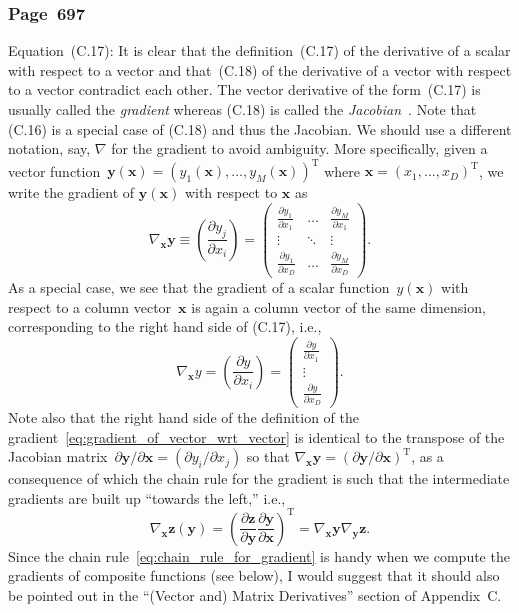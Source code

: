 \documentclass[12pt,a4paper]{article}
\newcommand{\erratum}[1]{%
\subsubsection*{#1}
\addcontentsline{toc}{subsection}{#1}}
\begin{document}
\erratum{Page~697}
Equation~(C.17):
It is clear that the definition~(C.17) of the derivative of a scalar with respect to a vector
and that~(C.18) of the derivative of a vector with respect to a vector contradict each other.
The vector derivative of the form~(C.17) is usually called the \emph{gradient}
whereas (C.18) is called the \emph{Jacobian}~\citep{Minka:OldNewMatrixAlgebra}.
Note that (C.16) is a special case of (C.18) and thus the Jacobian.
We should use a different notation, say, $\nabla$ for the gradient to avoid ambiguity.
More specifically, given a vector function~$\mathbf{y}(\mathbf{x}) =
\left(y_1(\mathbf{x}), \dots, y_M(\mathbf{x})\right)^{\operatorname{T}}$
where $\mathbf{x} = \left(x_1, \dots, x_D \right)^{\operatorname{T}}$,
we write the gradient of $\mathbf{y}(\mathbf{x})$ with respect to $\mathbf{x}$ as
\begin{equation}
\nabla_{\mathbf{x}} \mathbf{y} \equiv \left( \frac{\partial y_j}{\partial x_i} \right) =
\begin{pmatrix}
\frac{\partial y_1}{\partial x_1} & \hdots & \frac{\partial y_M}{\partial x_1} \\
\vdots & \ddots & \vdots \\
\frac{\partial y_1}{\partial x_D} & \hdots & \frac{\partial y_M}{\partial x_D}
\end{pmatrix} .
\label{eq:gradient_of_vector_wrt_vector}
\end{equation}
As a special case, we see that the gradient of a scalar function~$y(\mathbf{x})$ with respect to
a column vector~$\mathbf{x}$ is again a column vector of the same dimension,
corresponding to the right hand side of (C.17), i.e.,
\begin{equation}
\nabla_{\mathbf{x}} y = \left( \frac{\partial y}{\partial x_i} \right) =
\begin{pmatrix}
\frac{\partial y}{\partial x_1} \\
\vdots  \\
\frac{\partial y}{\partial x_D}
\end{pmatrix} .
\end{equation}
Note also that the right hand side of the definition of
the gradient~\eqref{eq:gradient_of_vector_wrt_vector} is identical to
the transpose of the Jacobian matrix~$\partial\mathbf{y}/\partial\mathbf{x} =
\left( \partial y_i/\partial x_j \right)$
so that $\nabla_{\mathbf{x}} \mathbf{y} =
\left( \partial\mathbf{y}/\partial\mathbf{x} \right)^{\operatorname{T}}$,
as a consequence of which the chain rule for the gradient is such that the intermediate gradients
are built up ``towards the left,'' i.e.,
\begin{equation}
\nabla_{\mathbf{x}} \mathbf{z}(\mathbf{y}) =
\left(
  \frac{\partial\mathbf{z}}{\partial\mathbf{y}}
  \frac{\partial\mathbf{y}}{\partial\mathbf{x}}
\right)^{\operatorname{T}} =
\nabla_\mathbf{x} \mathbf{y} \nabla_\mathbf{y} \mathbf{z}.
\label{eq:chain_rule_for_gradient}
\end{equation}
Since the chain rule~\eqref{eq:chain_rule_for_gradient} is handy
when we compute the gradients of composite functions (see below),
I would suggest that it should also be pointed out in
the ``(Vector and) Matrix Derivatives'' section of Appendix~C.
\end{document}
